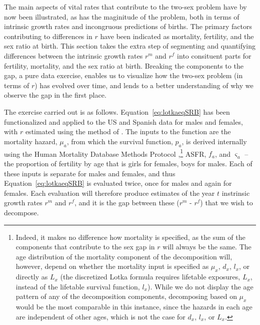  \FloatBarrier
\label{sec:Decompr}
The main aspects of vital rates that contribute to the two-sex problem have by
now been illustrated, as has the maginitude of the problem, both in terms of
intrinsic growth rates and incongruous predictions of births. The primary
factors contributing to differences in $r$ have been indicated as mortality,
fertility, and the sex ratio at birth. This section takes the extra step of segmenting and
quantifying differences between the intrinsic growth rates $r^m$ and $r^f$ into
consituent parts for fertility, mortality, and the sex ratio at birth. Breaking
the components to the gap, a pure data exercise, enables us to
visualize how the two-sex problem (in terms of $r$) has evolved over time, and
lends to a better understanding of why we observe the gap in the first place.

The exercise carried out is as follows. Equation~\eqref{eq:lotkaeqSRB} has been
functionalized and applied to the US and Spanish data for males and females,
with $r$ estimated using the method of \citet{coale1957new}. The inputs to the
function are the mortality hazard, $\mu_a$, from which the survival function,
$p_a$, is derived internally using the Human Mortality Database Methods
Protocol \citep{wilmoth2007methods},\footnote{Indeed, it makes no difference how
mortality is specified, as the sum of the components that contribute to the
sex gap in $r$ will always be the same. The age distribution of the mortality
component of the decomposition will, however, depend on whether the
mortality input is specified as $\mu_x$, $d_x$, $l_x$, or directly as $L_x$ (the
discretized Lotka formula requires lifetable exposures, $L_x$, instead of the 
lifetable survival function, $l_x$). While we do not display the age pattern of
any of the decomposition components, decomposing based on $\mu_x$ would be the
most comparable in this instance, since the hazards in each age are independent
of other ages, which is not the case for $d_x$, $l_x$, or $L_x$.} ASFR, $f_a$,
and $\varsigma _a$ -- the proportion of fertility by age that is girls for
females, boys for males. Each of these inputs is separate for males and females, and thus
Equation~\eqref{eq:lotkaeqSRB} is evaluated twice, once for males and again for
females. Each evaluation will therefore produce estimates of the year $t$
instrinsic growth rates $r^m$ and $r^f$, and it is the gap between
these ($r^m$ - $r^f$) that we wish to decompose.

